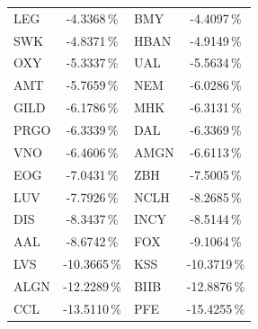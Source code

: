 \begin{longtable}{l c | l c}
    LEG    & -4.3368\,\%            & BMY    & -4.4097\,\%                                   \\
    SWK    & -4.8371\,\%            & HBAN   & -4.9149\,\%                                   \\
    OXY    & -5.3337\,\%            & UAL    & -5.5634\,\%                                   \\
    AMT    & -5.7659\,\%            & NEM    & -6.0286\,\%                                   \\
    GILD   & -6.1786\,\%            & MHK    & -6.3131\,\%                                   \\
    PRGO   & -6.3339\,\%            & DAL    & -6.3369\,\%                                   \\
    VNO    & -6.4606\,\%            & AMGN   & -6.6113\,\%                                   \\
    EOG    & -7.0431\,\%            & ZBH    & -7.5005\,\%                                   \\
    LUV    & -7.7926\,\%            & NCLH   & -8.2685\,\%                                   \\
    DIS    & -8.3437\,\%            & INCY   & -8.5144\,\%                                   \\
    AAL    & -8.6742\,\%            & FOX    & -9.1064\,\%                                   \\
    LVS    & -10.3665\,\%           & KSS    & -10.3719\,\%                                  \\
    ALGN   & -12.2289\,\%           & BIIB   & -12.8876\,\%                                  \\
    CCL    & -13.5110\,\%           & PFE    & -15.4255\,\%                                  \\
\end{longtable}